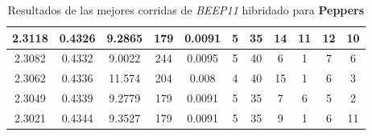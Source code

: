 \begin{table}[h!]
\begin{center}
\begin{tabular}{|c|c|c|c|c|c|c|c|c|c|c|}
        \hline
        \hline
            2.3118 & 0.4326  & 9.2865 & 179 & 0.0091 & 5 & 35 & 14 & 11 & 12 & 10\\
        \hline
        \hline
            2.3082 & 0.4332  & 9.0022 & 244 & 0.0095 & 5 & 40 & 6 & 1 & 7 & 6\\
        \hline
        \hline
            2.3062 & 0.4336  & 11.574 & 204 & 0.008 & 4 & 40 & 15 & 1 & 6 & 3\\
        \hline
        \hline
            2.3049 & 0.4339  & 9.2779 & 179 & 0.0091 & 5 & 35 & 7 & 6 & 5 & 2\\
        \hline
        \hline
            2.3021 & 0.4344  & 9.3527 & 179 & 0.0091 & 5 & 35 & 9 & 1 & 6 & 11\\
        \hline
        \end{tabular}
        \caption{Resultados de las mejores corridas de \emph{BEEP11} hibridado para {\bf Peppers}}
        \label{tb:tableBEEP11}
    \end{center}
\end{table}
